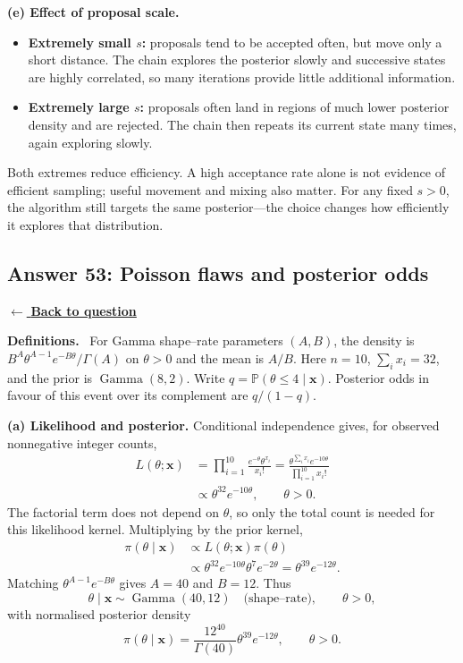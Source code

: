 \documentclass[11pt,a4paper]{article}
\newcommand{\given}{\mathrel{|}}
\newcommand{\xvec}{\boldsymbol{x}}
\newcommand{\answernav}[1]{%
  \label{answer:#1}%
  \noindent\hyperref[question:#1]{$\leftarrow$ \textbf{Back to question}}%
  \par\smallskip}
\newcommand{\studyheading}[1]{%
  \par\medskip\noindent\textcolor{statblue}{\textbf{#1.}}\ }
\begin{document}
\textbf{(e) Effect of proposal scale.}
\begin{itemize}[leftmargin=*]
  \item \textbf{Extremely small $s$:} proposals tend to be accepted often,
        but move only a short distance. The chain explores the posterior
        slowly and successive states are highly correlated, so many
        iterations provide little additional information.
  \item \textbf{Extremely large $s$:} proposals often land in regions
        of much lower posterior density and are rejected. The chain then
        repeats its current state many times, again exploring slowly.
\end{itemize}
Both extremes reduce efficiency. A high acceptance rate alone is not
evidence of efficient sampling; useful movement and mixing also matter.
For any fixed $s>0$, the algorithm still targets the same posterior---the
choice changes how efficiently it explores that distribution.

\clearpage

\subsection{Answer 53: Poisson flaws and posterior odds}
\answernav{53}

\studyheading{Definitions}
For Gamma shape--rate parameters $(A,B)$, the density is
$B^A\theta^{A-1}e^{-B\theta}/\Gamma(A)$ on $\theta>0$ and the mean is $A/B$.
Here $n=10$, $\sum_i x_i=32$, and the prior is $\operatorname{Gamma}(8,2)$.
Write $q=\mathbb P(\theta\le4\given\xvec)$.
Posterior odds in favour of this event over its complement are $q/(1-q)$.

\textbf{(a) Likelihood and posterior.}
Conditional independence gives, for observed nonnegative integer counts,
\[
\begin{aligned}
L(\theta;\xvec)
&=\prod_{i=1}^{10}\frac{e^{-\theta}\theta^{x_i}}{x_i!}
=\frac{\theta^{\sum_i x_i}e^{-10\theta}}{\prod_{i=1}^{10}x_i!}\\
&\propto\theta^{32}e^{-10\theta},\qquad\theta>0.
\end{aligned}
\]
The factorial term does not depend on $\theta$, so only the total count is
needed for this likelihood kernel. Multiplying by the prior kernel,
\[
\begin{aligned}
\pi(\theta\given\xvec)
&\propto L(\theta;\xvec)\pi(\theta)\\
&\propto\theta^{32}e^{-10\theta}\theta^7e^{-2\theta}
=\theta^{39}e^{-12\theta}.
\end{aligned}
\]
Matching $\theta^{A-1}e^{-B\theta}$ gives $A=40$ and $B=12$. Thus
\[
\boxed{\theta\given\xvec\sim\operatorname{Gamma}(40,12)
\quad\text{(shape--rate)},\qquad\theta>0,}
\]
with normalised posterior density
\[
\boxed{\pi(\theta\given\xvec)
=\frac{12^{40}}{\Gamma(40)}\theta^{39}e^{-12\theta},
\qquad\theta>0.}
\]
\end{document}

